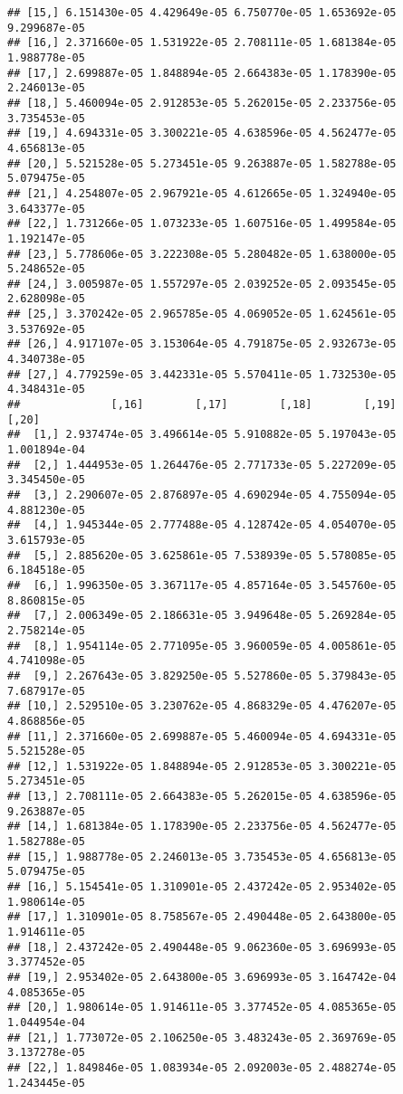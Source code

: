 \documentclass[
]{article}
\begin{document}
\begin{verbatim}
## [15,] 6.151430e-05 4.429649e-05 6.750770e-05 1.653692e-05 9.299687e-05
## [16,] 2.371660e-05 1.531922e-05 2.708111e-05 1.681384e-05 1.988778e-05
## [17,] 2.699887e-05 1.848894e-05 2.664383e-05 1.178390e-05 2.246013e-05
## [18,] 5.460094e-05 2.912853e-05 5.262015e-05 2.233756e-05 3.735453e-05
## [19,] 4.694331e-05 3.300221e-05 4.638596e-05 4.562477e-05 4.656813e-05
## [20,] 5.521528e-05 5.273451e-05 9.263887e-05 1.582788e-05 5.079475e-05
## [21,] 4.254807e-05 2.967921e-05 4.612665e-05 1.324940e-05 3.643377e-05
## [22,] 1.731266e-05 1.073233e-05 1.607516e-05 1.499584e-05 1.192147e-05
## [23,] 5.778606e-05 3.222308e-05 5.280482e-05 1.638000e-05 5.248652e-05
## [24,] 3.005987e-05 1.557297e-05 2.039252e-05 2.093545e-05 2.628098e-05
## [25,] 3.370242e-05 2.965785e-05 4.069052e-05 1.624561e-05 3.537692e-05
## [26,] 4.917107e-05 3.153064e-05 4.791875e-05 2.932673e-05 4.340738e-05
## [27,] 4.779259e-05 3.442331e-05 5.570411e-05 1.732530e-05 4.348431e-05
##              [,16]        [,17]        [,18]        [,19]        [,20]
##  [1,] 2.937474e-05 3.496614e-05 5.910882e-05 5.197043e-05 1.001894e-04
##  [2,] 1.444953e-05 1.264476e-05 2.771733e-05 5.227209e-05 3.345450e-05
##  [3,] 2.290607e-05 2.876897e-05 4.690294e-05 4.755094e-05 4.881230e-05
##  [4,] 1.945344e-05 2.777488e-05 4.128742e-05 4.054070e-05 3.615793e-05
##  [5,] 2.885620e-05 3.625861e-05 7.538939e-05 5.578085e-05 6.184518e-05
##  [6,] 1.996350e-05 3.367117e-05 4.857164e-05 3.545760e-05 8.860815e-05
##  [7,] 2.006349e-05 2.186631e-05 3.949648e-05 5.269284e-05 2.758214e-05
##  [8,] 1.954114e-05 2.771095e-05 3.960059e-05 4.005861e-05 4.741098e-05
##  [9,] 2.267643e-05 3.829250e-05 5.527860e-05 5.379843e-05 7.687917e-05
## [10,] 2.529510e-05 3.230762e-05 4.868329e-05 4.476207e-05 4.868856e-05
## [11,] 2.371660e-05 2.699887e-05 5.460094e-05 4.694331e-05 5.521528e-05
## [12,] 1.531922e-05 1.848894e-05 2.912853e-05 3.300221e-05 5.273451e-05
## [13,] 2.708111e-05 2.664383e-05 5.262015e-05 4.638596e-05 9.263887e-05
## [14,] 1.681384e-05 1.178390e-05 2.233756e-05 4.562477e-05 1.582788e-05
## [15,] 1.988778e-05 2.246013e-05 3.735453e-05 4.656813e-05 5.079475e-05
## [16,] 5.154541e-05 1.310901e-05 2.437242e-05 2.953402e-05 1.980614e-05
## [17,] 1.310901e-05 8.758567e-05 2.490448e-05 2.643800e-05 1.914611e-05
## [18,] 2.437242e-05 2.490448e-05 9.062360e-05 3.696993e-05 3.377452e-05
## [19,] 2.953402e-05 2.643800e-05 3.696993e-05 3.164742e-04 4.085365e-05
## [20,] 1.980614e-05 1.914611e-05 3.377452e-05 4.085365e-05 1.044954e-04
## [21,] 1.773072e-05 2.106250e-05 3.483243e-05 2.369769e-05 3.137278e-05
## [22,] 1.849846e-05 1.083934e-05 2.092003e-05 2.488274e-05 1.243445e-05

\end{verbatim}
\end{document}
